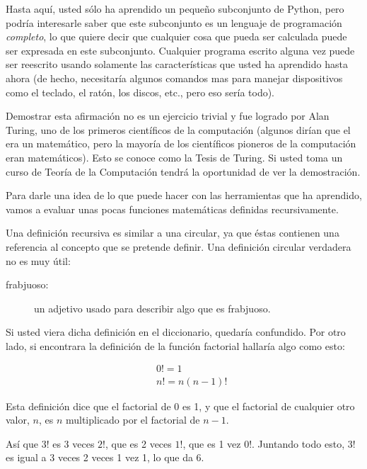 Hasta aquí, usted sólo ha aprendido un pequeño subconjunto de Python,
pero podría interesarle saber que este subconjunto es un lenguaje
de programación {\em completo}, lo que quiere decir que cualquier
cosa que pueda ser calculada puede ser expresada en este subconjunto.
Cualquier programa escrito alguna vez puede ser reescrito usando solamente
las características que usted ha aprendido hasta ahora (de hecho,
necesitaría algunos comandos mas para manejar dispositivos como el
teclado, el ratón, los discos, etc., pero eso sería todo).

Demostrar esta afirmación no es un ejercicio trivial y fue logrado
por Alan Turing, uno de los primeros científicos de la computación
(algunos dirían que el era un matemático, pero la mayoría de los científicos
pioneros de la computación eran matemáticos). Esto se conoce como
la Tesis de Turing. Si usted toma un curso de Teoría de la Computación
tendrá la oportunidad de ver la demostración.

Para darle una idea de lo que puede hacer con las herramientas que
ha aprendido, vamos a evaluar unas pocas funciones matemáticas definidas
recursivamente.

Una definición recursiva es similar a una circular, ya que éstas contienen
una referencia al concepto que se pretende definir. Una definición
circular verdadera no es muy útil:
\begin{description}
\item [{frabjuoso:}] un adjetivo usado para describir algo que es frabjuoso.
\end{description}
  

Si usted viera dicha definición en el diccionario, quedaría confundido.
Por otro lado, si encontrara la definición de la función factorial
hallaría algo como esto:

\vspace{-0.35in}
 
\begin{eqnarray*}
 &  & 0!=1\\
 &  & n!=n(n-1)!
\end{eqnarray*}
\vspace{-0.25in}

Esta definición dice que el factorial de 0 es 1, y que el factorial
de cualquier otro valor, $n$, es $n$ multiplicado por el factorial
de $n-1$.

Así que $3!$ es 3 veces $2!$, que es 2 veces $1!$, que es 1 vez
$0!$. Juntando todo esto, $3!$ es igual a 3 veces 2 veces 1 vez
1, lo que da 6.

